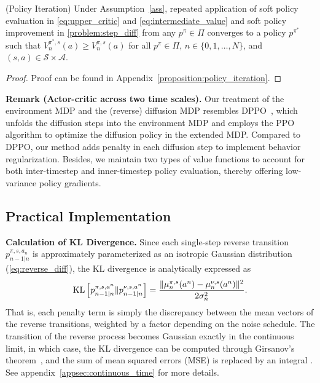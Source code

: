 \begin{proposition}{(Policy Iteration)}
Under Assumption~\ref{ass}, repeated application of soft policy evaluation in \eqref{eq:upper_critic} and \eqref{eq:intermediate_value} and soft policy improvement in \eqref{problem:step_diff} from any $p^\pi\in\Pi$ converges to a policy $p^{\pi^*}$ such that $V_n^{\pi^*,s}(a)\geq V_n^{\pi,s}(a)$ for all $p^\pi\in\Pi$, $n\in\{0,1,\ldots,N\}$, and $(s,a)\in\mathcal{S}\times\mathcal{A}$.
\end{proposition}
\begin{proof}
Proof can be found in Appendix~\ref{proposition:policy_iteration}. 
\end{proof}




\textbf{Remark (Actor-critic across two time scales). }Our treatment of the environment MDP and the (reverse) diffusion MDP resembles DPPO~\citep{dppo}, which unfolds the diffusion steps into the environment MDP and employs the PPO~\citep{ppo} algorithm to optimize the diffusion policy in the extended MDP. Compared to DPPO, our method adds penalty in each diffusion step to implement behavior regularization. Besides, we maintain two types of value functions to account for both inter-timestep and inner-timestep policy evaluation, thereby offering low-variance policy gradients. 

\subsection{Practical Implementation}
\textbf{Calculation of KL Divergence. }
Since each single-step reverse transition $p_{n-1|n}^{\pi,s,a_n}$ is approximately parameterized as an isotropic Gaussian distribution (\eqref{eq:reverse_diff}), %
the KL divergence is analytically expressed as
\begin{equation}
    \begin{aligned}
        \operatorname{KL}\left[p^{\pi, s,a^n}_{n-1|n}\|p^{\nu, s,a^n}_{n-1|n}\right]=\frac{\|\mu^{\pi,s}_n(a^n)-\mu^{\nu,s}_n(a^n)\|^2}{2\sigma_n^2}.
    \end{aligned}
\end{equation}
That is, each penalty term is simply the discrepancy between the mean vectors of the reverse transitions, weighted by a factor depending on the noise schedule. The transition of the reverse process becomes Gaussian exactly in the continuous limit, in which case, the KL divergence can be computed through Girsanov's theorem~\citep{oksendal2013stochastic}, and the sum of mean squared errors (MSE) is replaced by an integral \cite{minde}. See appendix~\ref{appsec:continuous_time} for more details.

